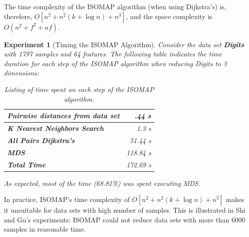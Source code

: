 \documentclass[12pt]{report}
\newtheorem{experiment}{Experiment}[section]
\begin{document}
The time complexity of the ISOMAP algorithm (when using Dijkstra's) is, therefore, $O[n^2 + n^2(k + \log n) + n^3]$, and the space complexity is $O(n^2 + f^2 + nf)$.

\begin{experiment}[Timing the ISOMAP Algorithm]
	Consider the data set \textbf{Digits} with 1797 samples and 64 features. The following table indicates the time duration for each step of the ISOMAP algorithm when reducing Digits to 3 dimensions:

	\begin{table}[H]
		\centering
		\begin{tabular}{|l|r|}
			\hline
			\textbf{Pairwise distances from data set} & .44 s \\\hline
			\textbf{K Nearest Neighbors Search} & 1.3 s \\\hline
			\textbf{All Pairs Dijkstra's} & 51.44 s\\\hline
			\textbf{MDS} & 118.84 s \\\hline
			\textbf{Total Time} & 172.69 s \\\hline
		\end{tabular}

		\caption{Listing of time spent on each step of the ISOMAP algorithm.}
	\end{table}

	As expected, most of the time (68.81\%) was spent executing MDS.
\end{experiment}

In practice, ISOMAP's time complexity of $O[n^2 + n^2(k + \log n) + n^3]$ makes it unsuitable for data sets with high number of samples. This is illustrated in Shi and Gu's experiments: ISOMAP could not reduce data sets with more than 6000 samples in reasonable time. \cite{shi2012fast}
\end{document}
